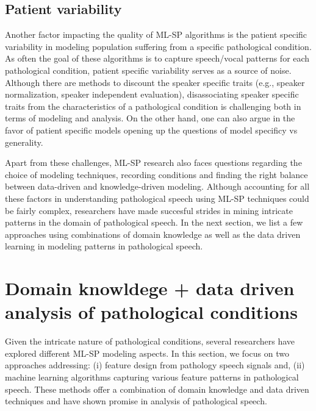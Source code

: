 \documentclass{article}
\begin{document}
\subsection{Patient variability}
\label{sec:PatVar}
Another factor impacting the quality of ML-SP algorithms is the patient specific variability in modeling population suffering from a specific pathological condition. 
As often the goal of these algorithms is to capture speech/vocal patterns for each pathological condition, patient specific variability serves as a source of noise.
Although there are methods to discount the speaker specific traits (e.g., speaker normalization, speaker independent evaluation), disassociating speaker specific traits\cite{berisha2013selecting} from the characteristics of a pathological condition is challenging both in terms of modeling and analysis. 
On the other hand, one can also argue in the favor of patient specific models opening up the questions of model specificy vs generality. 

Apart from these challenges, ML-SP research also faces questions regarding the choice of modeling techniques, recording conditions and finding the right balance between data-driven and knowledge-driven modeling. 
Although accounting for all these factors in understanding pathological speech using ML-SP techniques could be fairly complex, researchers have made succesful strides in mining intricate patterns in the domain of pathological speech.
In the next section, we list a few approaches using combinations of domain knowledge as well as the data driven learning in modeling patterns in pathological speech. 

\section{Domain knowldege + data driven analysis of pathological conditions}
Given the intricate nature of pathological conditions, several researchers have explored different ML-SP modeling aspects. 
In this section, we focus on two approaches addressing: (i) feature design from pathology speech signals and, (ii) machine learning algorithms capturing various feature patterns in pathological speech.
These methods offer a combination of domain knowledge and data driven techniques and have shown promise in analysis of pathological speech.
 
\end{document}
